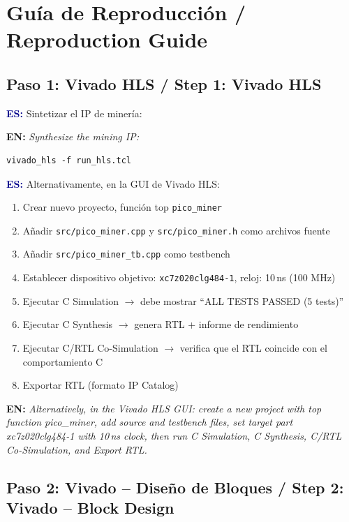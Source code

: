 \documentclass[12pt,a4paper]{article}
\newcommand{\bsection}[2]{%
    \section{#1 \textnormal{\normalsize\color{accentblue}/ #2}}%
}
\newcommand{\bsubsection}[2]{%
    \subsection{#1 \textnormal{\small\color{accentblue}/ #2}}%
}
\newenvironment{bilingual}{%
    \par\medskip
}{%
    \par\medskip
}
\newcommand{\espara}[1]{\noindent\textcolor{darkblue}{\textbf{ES:}} #1\par\smallskip}
\newcommand{\enpara}[1]{\noindent\textcolor{accentblue}{\textbf{EN:}} \textit{#1}\par\smallskip}
\begin{document}
\bsection{Gu\'ia de Reproducci\'on}{Reproduction Guide}

\bsubsection{Paso 1: Vivado HLS}{Step 1: Vivado HLS}

\begin{bilingual}
\espara{%
Sintetizar el IP de miner\'ia:}

\enpara{%
Synthesize the mining IP:}
\end{bilingual}

\begin{lstlisting}[style=tclstyle]
vivado_hls -f run_hls.tcl
\end{lstlisting}

\begin{bilingual}
\espara{%
Alternativamente, en la GUI de Vivado HLS:
\begin{enumerate}[leftmargin=2em]
    \item Crear nuevo proyecto, funci\'on top \texttt{pico\_miner}
    \item A\~nadir \texttt{src/pico\_miner.cpp} y \texttt{src/pico\_miner.h} como archivos fuente
    \item A\~nadir \texttt{src/pico\_miner\_tb.cpp} como testbench
    \item Establecer dispositivo objetivo: \texttt{xc7z020clg484-1}, reloj: 10\,ns (100 MHz)
    \item Ejecutar C Simulation $\rightarrow$ debe mostrar ``ALL TESTS PASSED (5 tests)''
    \item Ejecutar C Synthesis $\rightarrow$ genera RTL + informe de rendimiento
    \item Ejecutar C/RTL Co-Simulation $\rightarrow$ verifica que el RTL coincide con el comportamiento C
    \item Exportar RTL (formato IP Catalog)
\end{enumerate}}

\enpara{%
Alternatively, in the Vivado HLS GUI: create a new project with top function
pico\_miner, add source and testbench files, set target part xc7z020clg484-1
with 10\,ns clock, then run C Simulation, C Synthesis, C/RTL Co-Simulation,
and Export RTL.}
\end{bilingual}

\bsubsection{Paso 2: Vivado -- Dise\~no de Bloques}{Step 2: Vivado -- Block Design}
\end{document}
